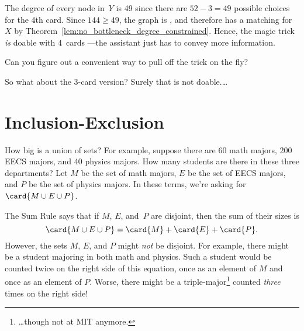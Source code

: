 \begin{editingnotes}
The degree of every node in~$Y$ is 49 since there are $52 - 3 = 49$
possible choices for the 4th card.  Since $144 \ge 49$, the graph is
, and therefore has a matching for~$X$ by
Theorem~\ref{lem:no_bottleneck_degree_constrained}.
Hence, the magic trick \emph{is} doable with 4~cards ---the assistant
just has to convey more information.  


Can you figure out a convenient
way to pull off the trick on the fly?

So what about the 3-card version?  Surely that is not doable.\dots
\end{editingnotes}

\begin{problems}

\practiceproblems
{}

\classproblems
{}


\homeworkproblems
{}
\end{problems}



\section{Inclusion-Exclusion}\label{inc-ex_sec}

How big is a union of sets?  For example, suppose there are 60 math
majors, 200 EECS majors, and 40 physics majors.  How many students are
there in these three departments?  Let $M$ be the set of math majors,
$E$ be the set of EECS majors, and $P$ be the set of physics majors.  In
these terms, we're asking for $\card{M \cup E \cup P}$.

The Sum Rule says that if $M$, $E$, and~$P$ are disjoint, then the sum
of their sizes is
%
\[
\card{M \cup E \cup P} = \card{M} + \card{E} + \card{P} .
\]
%
However, the sets $M$, $E$, and $P$ might \emph{not} be disjoint.  For
example, there might be a student majoring in both math and
physics.  Such a student would be counted twice on the right side of this
equation, once as an element of $M$ and once as an element of $P$.  Worse,
there might be a triple-major\footnote{\dots though not at MIT anymore.}
counted \emph{three} times on the right side!

